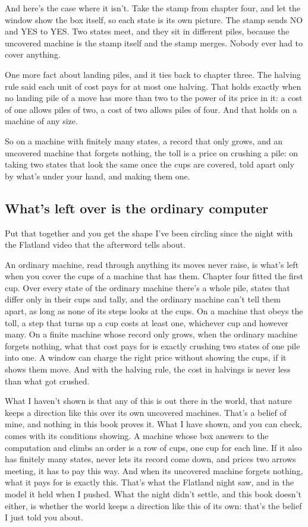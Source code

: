 \documentclass[11pt,twoside]{article}
\theoremstyle{thielethm}
\theoremstyle{thieledef}
\theoremstyle{thieledef}
\theoremstyle{thieledef}
\theoremstyle{thielethm}
\theoremstyle{thieleobs}
\theoremstyle{thielethm}
\begin{document}
And here's the case where it isn't. Take the stamp from chapter four, and let the window show the box itself, so each state is its own picture. The stamp sends NO and YES to YES. Two states meet, and they sit in different piles, because the uncovered machine is the stamp itself and the stamp merges. Nobody ever had to cover anything.

One more fact about landing piles, and it ties back to chapter three. The halving rule said each unit of cost pays for at most one halving. That holds exactly when no landing pile of a move has more than two to the power of its price in it: a cost of one allows piles of two, a cost of two allows piles of four. And that holds on a machine of any size.

So on a machine with finitely many states, a record that only grows, and an uncovered machine that forgets nothing, the toll is a price on crushing a pile: on taking two states that look the same once the cups are covered, told apart only by what's under your hand, and making them one.

\subsection{What's left over is the ordinary computer}

Put that together and you get the shape I've been circling since the night with the Flatland video that the afterword tells about.

An ordinary machine, read through anything its moves never raise, is what's left when you cover the cups of a machine that has them. Chapter four fitted the first cup. Over every state of the ordinary machine there's a whole pile, states that differ only in their cups and tally, and the ordinary machine can't tell them apart, as long as none of its steps looks at the cups. On a machine that obeys the toll, a step that turns up a cup costs at least one, whichever cup and however many. On a finite machine whose record only grows, when the ordinary machine forgets nothing, what that cost pays for is exactly crushing two states of one pile into one. A window can charge the right price without showing the cups, if it shows them move. And with the halving rule, the cost in halvings is never less than what got crushed.

What I haven't shown is that any of this is out there in the world, that nature keeps a direction like this over its own uncovered machines. That's a belief of mine, and nothing in this book proves it. What I have shown, and you can check, comes with its conditions showing. A machine whose box answers to the computation and climbs an order is a row of cups, one cup for each line. If it also has finitely many states, never lets its record come down, and prices two arrows meeting, it has to pay this way. And when its uncovered machine forgets nothing, what it pays for is exactly this. That's what the Flatland night saw, and in the model it held when I pushed. What the night didn't settle, and this book doesn't either, is whether the world keeps a direction like this of its own: that's the belief I just told you about.
\end{document}
